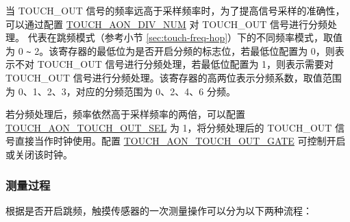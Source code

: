 \documentclass[main\_\_CN.tex]{subfiles}
\begin{document}
当 TOUCH\_OUT 信号的频率远高于采样频率时，为了提高信号采样的准确性，可以通过配置 \hyperref[fielddesc:TOUCHAONDIVNUM0]{TOUCH\_AON\_DIV\_NUM} 对 TOUCH\_OUT 信号进行分频处理。 代表在跳频模式（参考小节 \ref{sec:touch-freq-hop}）下的不同频率模式，取值为 0 \verb+~+ 2。该寄存器的最低位为是否开启分频的标志位，若最低位配置为 0，则表示不对 TOUCH\_OUT 信号进行分频处理，若最低位配置为 1，则表示需要对 TOUCH\_OUT 信号进行分频处理。该寄存器的高两位表示分频系数，取值范围为 0、1、2、3，对应的分频范围为 0、2、4、6 分频。

若分频处理后，频率依然高于采样频率的两倍，可以配置 \hyperref[fielddesc:TOUCHAONTOUCHOUTSEL]{TOUCH\_AON\_TOUCH\_OUT\_SEL} 为 1，将分频处理后的 TOUCH\_OUT 信号直接当作时钟使用。配置 \hyperref[fielddesc:TOUCHAONTOUCHOUTGATE]{TOUCH\_AON\_TOUCH\_OUT\_GATE} 可控制开启或关闭该时钟。

\subsubsection{测量过程}
\label{para:measurement-process}

根据是否开启跳频，触摸传感器的一次测量操作可以分为以下两种流程：
\end{document}
